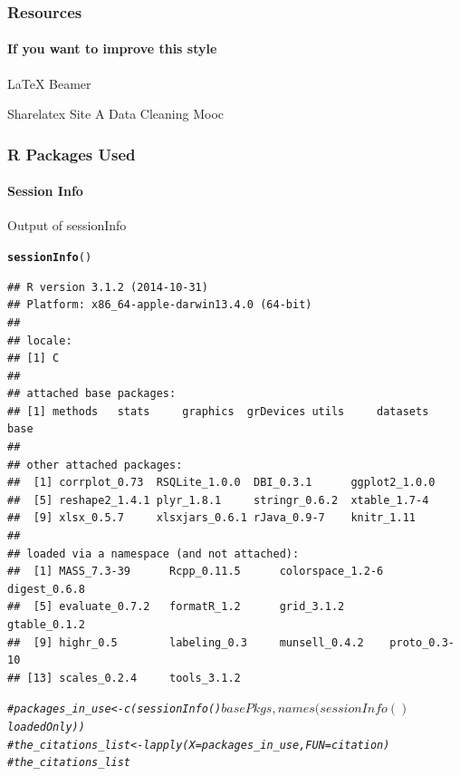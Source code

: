 \documentclass[12pt]{beamer}\usepackage[]{graphicx}\usepackage[]{color}
\makeatletter
\newcommand{\hlcom}[1]{\textcolor[rgb]{0.678,0.584,0.686}{\textit{#1}}}%
\newcommand{\hlstd}[1]{\textcolor[rgb]{0.345,0.345,0.345}{#1}}%
\newcommand{\hlkwd}[1]{\textcolor[rgb]{0.737,0.353,0.396}{\textbf{#1}}}%
\newenvironment{kframe}{%
 \def\at@end@of@kframe{}%
 \ifinner\ifhmode%
  \def\at@end@of@kframe{\end{minipage}}%
  \begin{minipage}{\columnwidth}%
 \fi\fi%
 \def\FrameCommand##1{\hskip\@totalleftmargin \hskip-\fboxsep
 \colorbox{shadecolor}{##1}\hskip-\fboxsep
     \hskip-\linewidth \hskip-\@totalleftmargin \hskip\columnwidth}%
 \MakeFramed {\advance\hsize-\width
   \@totalleftmargin\z@ \linewidth\hsize
   \@setminipage}}%
 {\par\unskip\endMakeFramed%
 \at@end@of@kframe}
\newenvironment{knitrout}{}{} %
\makeatother
\begin{document}
\begin{frame}
  \frametitle{Resources}
  \framesubtitle{If you want to improve this style}
  \begin{thebibliography}{10}

  \beamertemplatearticlebibitems
    LaTeX Beamer

  \bibitem{}
    Sharelatex Site %
  \bibitem{}
    A Data Cleaning Mooc %
  \end{thebibliography}
\end{frame}

\begin{frame}[fragile]
  \frametitle{R Packages Used}
  \framesubtitle{Session Info}
\begin{block}{Output of sessionInfo}
\end{block}
\begin{knitrout}
\color{fgcolor}\begin{kframe}
\begin{alltt}
\hlkwd{sessionInfo}\hlstd{()}
\end{alltt}
\begin{verbatim}
## R version 3.1.2 (2014-10-31)
## Platform: x86_64-apple-darwin13.4.0 (64-bit)
## 
## locale:
## [1] C
## 
## attached base packages:
## [1] methods   stats     graphics  grDevices utils     datasets  base     
## 
## other attached packages:
##  [1] corrplot_0.73  RSQLite_1.0.0  DBI_0.3.1      ggplot2_1.0.0 
##  [5] reshape2_1.4.1 plyr_1.8.1     stringr_0.6.2  xtable_1.7-4  
##  [9] xlsx_0.5.7     xlsxjars_0.6.1 rJava_0.9-7    knitr_1.11    
## 
## loaded via a namespace (and not attached):
##  [1] MASS_7.3-39      Rcpp_0.11.5      colorspace_1.2-6 digest_0.6.8    
##  [5] evaluate_0.7.2   formatR_1.2      grid_3.1.2       gtable_0.1.2    
##  [9] highr_0.5        labeling_0.3     munsell_0.4.2    proto_0.3-10    
## [13] scales_0.2.4     tools_3.1.2
\end{verbatim}
\begin{alltt}
\hlcom{#  packages_in_use <- c( sessionInfo()$basePkgs, names( sessionInfo()$loadedOnly ) )}
\hlcom{#the_citations_list <- lapply( X=packages_in_use, FUN=citation)}
\hlcom{#the_citations_list}
\end{alltt}
\end{kframe}
\end{knitrout}
\end{frame}
\end{document}
